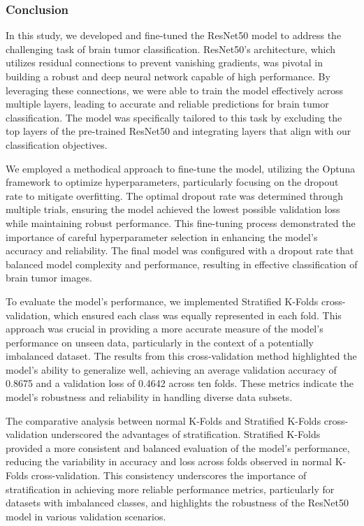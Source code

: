 \subsubsection{Conclusion}\label{s:conclusion}

In this study, we developed and fine-tuned the ResNet50 model to address the challenging task of brain tumor classification. ResNet50's architecture, which utilizes residual connections to prevent vanishing gradients, was pivotal in building a robust and deep neural network capable of high performance. By leveraging these connections, we were able to train the model effectively across multiple layers, leading to accurate and reliable predictions for brain tumor classification. The model was specifically tailored to this task by excluding the top layers of the pre-trained ResNet50 and integrating layers that align with our classification objectives.

We employed a methodical approach to fine-tune the model, utilizing the Optuna framework to optimize hyperparameters, particularly focusing on the dropout rate to mitigate overfitting. The optimal dropout rate was determined through multiple trials, ensuring the model achieved the lowest possible validation loss while maintaining robust performance. This fine-tuning process demonstrated the importance of careful hyperparameter selection in enhancing the model's accuracy and reliability. The final model was configured with a dropout rate that balanced model complexity and performance, resulting in effective classification of brain tumor images.

To evaluate the model's performance, we implemented Stratified K-Folds cross-validation, which ensured each class was equally represented in each fold. This approach was crucial in providing a more accurate measure of the model's performance on unseen data, particularly in the context of a potentially imbalanced dataset. The results from this cross-validation method highlighted the model's ability to generalize well, achieving an average validation accuracy of 0.8675 and a validation loss of 0.4642 across ten folds. These metrics indicate the model's robustness and reliability in handling diverse data subsets.

The comparative analysis between normal K-Folds and Stratified K-Folds cross-validation underscored the advantages of stratification. Stratified K-Folds provided a more consistent and balanced evaluation of the model's performance, reducing the variability in accuracy and loss across folds observed in normal K-Folds cross-validation. This consistency underscores the importance of stratification in achieving more reliable performance metrics, particularly for datasets with imbalanced classes, and highlights the robustness of the ResNet50 model in various validation scenarios.

